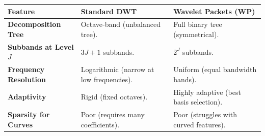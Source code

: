 \documentclass[12pt,a4paper]{article}
\renewcommand{\arraystretch}{1.45}
\begin{document}
\begin{tcolorbox}[tikzbox, title={\textbf{Summary Comparison: DWT vs. Wavelet Packets}}]
\par\noindent
{\renewcommand{\arraystretch}{1.4}%
\begin{tabularx}{\linewidth}{|B{3.2cm}|Y|Y|}
\hline
\textbf{Feature} & \textbf{Standard DWT} & \textbf{Wavelet Packets (WP)} \\
\hline
\textbf{Decomposition Tree} & Octave-band (unbalanced tree). & Full binary tree (symmetrical). \\
\hline
\textbf{Subbands at Level $J$} & $3J+1$ subbands. & $2^J$ subbands. \\
\hline
\textbf{Frequency Resolution} & Logarithmic (narrow at low frequencies). & Uniform (equal bandwidth bands). \\
\hline
\textbf{Adaptivity} & Rigid (fixed octaves). & Highly adaptive (best basis selection). \\
\hline
\textbf{Sparsity for Curves} & Poor (requires many coefficients). & Poor (struggles with curved features). \\
\hline
\end{tabularx}}
\end{tcolorbox}
\end{document}
